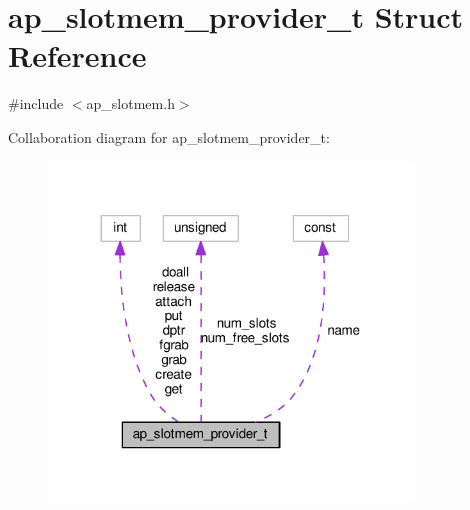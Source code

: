 \hypertarget{structap__slotmem__provider__t}{}\section{ap\+\_\+slotmem\+\_\+provider\+\_\+t Struct Reference}
\label{structap__slotmem__provider__t}


{\ttfamily \#include $<$ap\+\_\+slotmem.\+h$>$}



Collaboration diagram for ap\+\_\+slotmem\+\_\+provider\+\_\+t\+:
\nopagebreak
\begin{figure}[H]
\begin{center}
\leavevmode
\includegraphics[width=275pt]{structap__slotmem__provider__t__coll__graph}
\end{center}
\end{figure}
